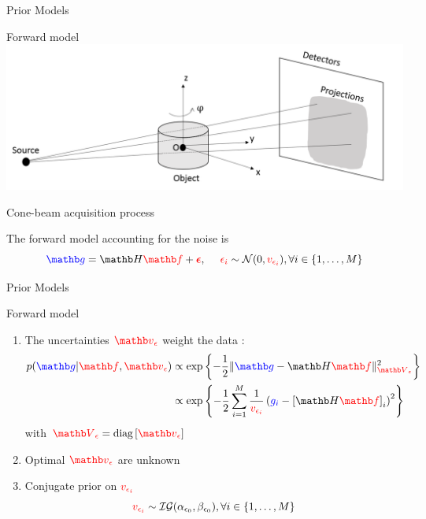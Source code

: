 \documentclass[latex]{beamer}
\def\beq{\[} \def\eeq{\]}
\begin{document}
\begin{frame}{Prior Models}
\begin{block}{Forward model}
\bfig[h]
\centering
\includegraphics[scale=0.4]{ConeBeamAcquisitionProcess}
\caption*{Cone-beam acquisition process}
\label{fig : Processus d'acquisition des projections}
\efig
The forward model accounting for the noise is
\beq
\bgb=\Hb\rfb+\red{\epsilonb}, \mbox{~~~~} \red{\epsilon_i} \sim \Nc(0, \red{v_{\epsilon_i}}), \forall i \in \left\{1, \dots, M\right\}
\eeq
\end{block}
\end{frame}

\begin{frame}{Prior Models}
\begin{block}{Forward model}
\begin{enumerate}
\item The uncertainties $\red{\vb_{\epsilon}}$ weight the data :
\begin{align*}
p(\bgb|\rfb, \red{\vb_{\epsilon}})&\propto\expf{-\frac{1}{2}\|\bgb-\Hb\rfb\|_{\red{\Vb_{\epsilon}}}^2} \\
&\propto \expf{-\frac{1}{2} \sum_{i=1}^{M} \frac{1}{\red{v_{\epsilon_{i}}}}\left(\blue{g_{i}}-\left[\Hb\rfb\right]_{i}\right)^{2}}
\end{align*}
with $\red{\Vb_{\epsilon}}=\diag{\red{\vb_{\epsilon}}}$
\item Optimal $\red{\vb_{\epsilon}}$ are unknown
\item Conjugate prior on ${\color{red}v_{\epsilon_i}}$
\beq
\red{v_{\epsilon_i}} \sim \Ic\Gc(\alpha_{\epsilon_0}, \beta_{\epsilon_0}), \forall i \in \left\{1, \dots, M\right\}
\eeq
\end{enumerate}
\end{block}
\end{frame}
\end{document}
